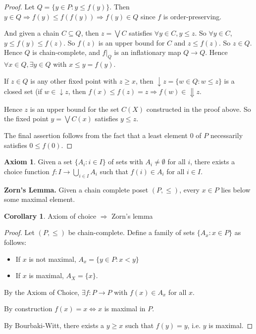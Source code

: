 \documentclass[a4paper]{article}
\theoremstyle{definition}
\newtheorem*{cor}{Corollary}
\newtheorem*{axiom}{Axiom}
\begin{document}
\begin{proof}
  Let $Q = \{y\in P: y\leq f(y)\}$. Then $y\in Q \Rightarrow f(y)\leq f(f(y)) \Rightarrow f(y)\in Q$ since $f$ is order-preserving.

And given a chain $C\subseteq Q$, then $z = \bigvee C$ satisfies $\forall y\in C, y\leq z$. So $\forall y\in C$, $y\leq f(y)\leq f(z)$. So $f(z)$ is an upper bound for $C$ and $z\leq f(z)$. So $z\in Q$. Hence $Q$ is chain-complete, and $f|_Q$ is an inflationary map $Q\to Q$. Hence $\forall x\in Q, \exists y\in Q$ with $x\leq y = f(y)$.

If $z\in Q$ is any other fixed point with $z\geq x$, then $\downarrow z = \{w\in Q: w\leq z\}$ is a closed set (if $w\in \downarrow z$, then $f(x) \leq f(z) = z\Rightarrow f(w)\in \Downarrow z$.

Hence $z$ is an upper bound for the set $C(X)$ constructed in the proof above. So the fixed point $y = \bigvee C(x)$ satisfies $y \leq z$.

The final assertion follows from the fact that a least element $0$ of $P$ necessarily satisfies $0 \leq f(0)$.
\end{proof}

\begin{axiom}
  Given a set $\{A_i: i\in I\}$ of sets with $A_i\not= \emptyset$ for all $i$, there exists a choice function $f: I\to \bigcup_{i\in I} A_i$ such that $f(i) \in A_i$ for all $i\in I$.
\end{axiom}

\textbf{Zorn's Lemma.} Given a chain complete poset $(P, \leq )$, every $x\in P$ lies below some maximal element.

\begin{cor}
  Axiom of choice $\Rightarrow$ Zorn's lemma
\end{cor}
\begin{proof}
  Let $(P, \leq)$ be chain-complete.
  Define a family of sets $\{A_x: x\in P\}$ as follows:
  \begin{itemize}
  \item If $x$ is not maximal, $A_x= \{ y\in P: x < y\}$
  \item If $x$ is maximal, $A_X = \{x\}$.
  \end{itemize}

  By the Axiom of Choice, $\exists f: P\to P$ with $f(x)\in A_x$ for all $x$.

  By construction $f(x) = x \Leftrightarrow x$ is maximal in $P$.

  By Bourbaki-Witt, there exists a $y \geq x$ such that $f(y) = y$, i.e. $y$ is maximal.
\end{proof}
\end{document}
